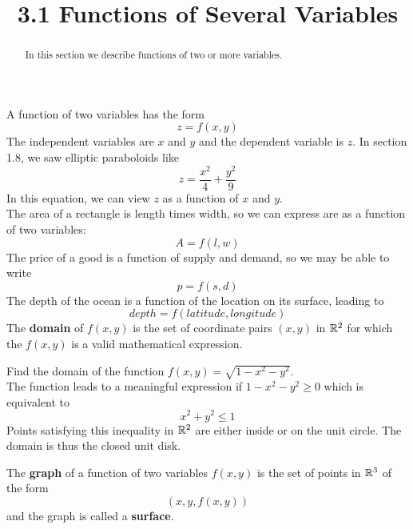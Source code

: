 \documentclass[handout]{ximera}
\title{3.1 Functions of Several Variables}
\begin{document}
\begin{abstract}
In this section we describe functions of two or more variables.
\end{abstract}

\maketitle

A function of two variables has the form
\[
z = f(x, y)
\]
The independent variables are $x$ and $y$ and the dependent variable is $z$. In section 1.8, we saw elliptic paraboloids like
\[
z = \frac{x^2}{4} + \frac{y^2}{9}
\]
In this equation, we can view $z$ as a function of $x$ and $y$.\\
The area of a rectangle is length times width, so we can express are as a function of two variables:
\[
A = f(l, w)
\]
The price of a good is a function of supply and demand, so we may be able to write
\[
p = f(s, d)
\]
The depth of the ocean is a function of the location on its surface, leading to
\[
depth = f(latitude, longitude)
\]
The \textbf{domain} of $f(x, y)$ is the set of coordinate pairs $(x, y)$ in $\mathbb R^2$ for which the $f(x, y)$ is a valid mathematical expression.

\begin{example}[Example 1]
Find the domain of the function $f(x, y) = \sqrt{1 - x^2 - y^2}$.\\
The function leads to a meaningful expression if $1 - x^2 - y^2 \geq 0$ which  is equivalent to 
\[
x^2 + y^2 \leq 1
\]
Points satisfying this inequality in $\mathbb R^2$ are either inside  or on the unit circle.
The domain is thus the closed unit disk.

\begin{image}
\end{image}


\end{example}

The \textbf{graph} of a function of two variables $f(x, y)$ is the set of points in $\mathbb R^3$ of the form
\[
(x, y, f(x,y))
\]
and the graph is called a \textbf{surface}.
\end{document}
